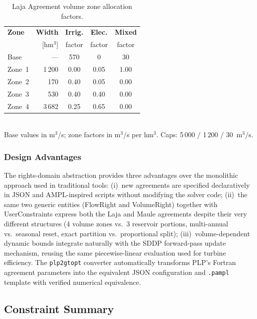 \begin{table}[t]
\centering
\caption{Laja Agreement volume zone allocation factors.}
\label{tab:laja_zones}
\small
\begin{tabular}{@{}lrccc@{}}
\toprule
\textbf{Zone} & \textbf{Width} & \textbf{Irrig.}
  & \textbf{Elec.} & \textbf{Mixed} \\
  & [hm$^3$] & factor & factor & factor \\
\midrule
Base       & ---     & 570    & 0      & 30   \\
Zone~1     & 1\,200  & 0.00   & 0.05   & 1.00 \\
Zone~2     & 170     & 0.40   & 0.05   & 0.00 \\
Zone~3     & 530     & 0.40   & 0.40   & 0.00 \\
Zone~4     & 3\,682  & 0.25   & 0.65   & 0.00 \\
\bottomrule
\end{tabular}
\\[4pt]
{\footnotesize Base values in m$^3$/s; zone factors in
m$^3$/s per hm$^3$.  Caps: 5\,000 / 1\,200 / 30~m$^3$/s.}
\end{table}

\subsubsection{Design Advantages}

The rights-domain abstraction provides three advantages over the
monolithic approach used in traditional tools: (i)~new agreements are
specified declaratively in JSON and AMPL-inspired scripts without
modifying the solver code; (ii)~the same two generic entities
(FlowRight and VolumeRight) together with UserConstraints express both
the Laja and Maule agreements despite their very different structures
(4 volume zones vs.\ 3 reservoir portions, multi-annual vs.\ seasonal
reset, exact partition vs.\ proportional split); (iii)~volume-dependent
dynamic bounds integrate naturally with the SDDP forward-pass update
mechanism, reusing the same piecewise-linear evaluation used for
turbine efficiency.  The \texttt{plp2gtopt} converter automatically
transforms PLP's Fortran agreement parameters into the equivalent
\gtopt{} JSON configuration and \texttt{.pampl} template with verified
numerical equivalence.

\subsection{Constraint Summary}


